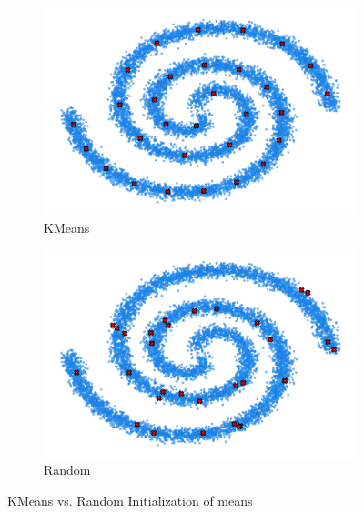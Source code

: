 \newpage
\begin{figure}[H]
    \centering
    \begin{subfigure}[b]{0.49\textwidth} 
        \centering
        \includegraphics[width=\textwidth]{figures/spirals/30_kmeans_data.png}
        \caption{KMeans}
    \end{subfigure}
    \begin{subfigure}[b]{0.49\textwidth} 
        \centering
        \includegraphics[width=\textwidth]{figures/spirals/30_random1_data.png} 
        \caption{Random}
    \end{subfigure} 
    \caption{KMeans vs. Random Initialization of means}
\end{figure}

